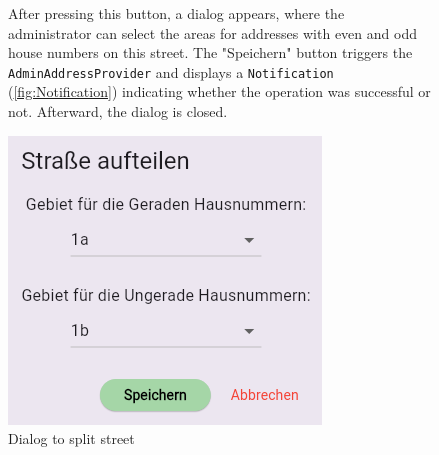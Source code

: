\begin{figure}[H] 
    \begin{minipage}{0.6\textwidth}
        After pressing this button, a dialog appears, where the administrator can select the areas for addresses with even and odd house numbers on this street. The "Speichern" button triggers the \texttt{AdminAddressProvider} and displays a \texttt{Notification} (\ref{fig:Notification}) indicating whether the operation was successful or not. Afterward, the dialog is closed.
    \end{minipage}
    \hfill
    \begin{minipage}{0.35\textwidth}
        \centering
        \includegraphics[width=\linewidth]{images/AdminPanel/splitStreetDialog.png}
        \caption{Dialog to split street}
    \end{minipage}
\end{figure}


\newpage


